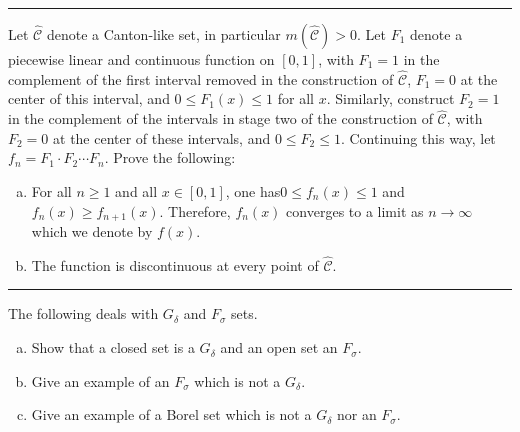 \documentclass[letterpaper, 12pt]{article}
\begin{document}
\noindent\rule{7in}{2.8pt}
\begin{problem}{1.10}
Let \(\hat{\mathcal{C}}\) denote a Canton-like set, in particular \(m(\hat{\mathcal{C}})>0\). Let \(F_1\) denote a piecewise linear and continuous function on \([0,1]\), with \(F_1=1\) in the complement of the first interval removed in the construction of \(\hat{\mathcal{C}}\), \(F_1=0\) at the center of this interval, and \(0\leq F_1(x)\leq 1\) for all \(x\). Similarly, construct \(F_2=1\) in the complement of the intervals in stage two of the construction of \(\hat{\mathcal{C}}\), with \(F_2=0\) at the center of these intervals, and \(0\leq F_2\leq 1\). Continuing this way, let \(f_n=F_1\cdot F_2\cdots F_n\). Prove the following:
\begin{enumerate}[(a)]
    \item For all \(n\geq 1\) and all \(x\in [0,1]\), one has\(0\leq f_n(x)\leq 1\) and \(f_n(x)\geq f_{n+1}(x)\). Therefore, \(f_n(x)\) converges to a limit as \(n\to \infty\) which we denote by \(f(x)\). 
    \item The function is discontinuous at every point of \(\hat{\mathcal{C}}\). 
\end{enumerate}
\end{problem}
\begin{solution}

\end{solution}

\noindent\rule{7in}{2.8pt}
\begin{problem}{1.13}
The following deals with \(G_\delta\) and \(F_\sigma\) sets. 
\begin{enumerate}[(a)]
  \item Show that a closed set is a \(G_\delta\) and an open set an \(F_\sigma\). 
  \item Give an example of an \(F_\sigma\) which is not a \(G_\delta\).
  \item Give an example of a Borel set which is not a \(G_\delta\) nor an \(F_\sigma\). 
\end{enumerate}
\end{problem}
\begin{solution}

\end{solution}
\end{document}
